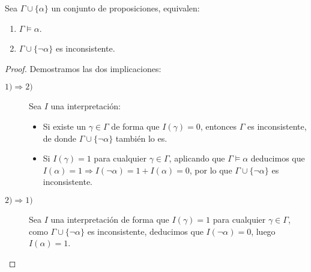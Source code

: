\begin{prop}
    Sea $\Gamma\cup\{\alpha\}$ un conjunto de proposiciones, equivalen:
    \begin{enumerate}
        \item $\Gamma\vDash \alpha$.
        \item $\Gamma\cup\{\lnot\alpha\}$ es inconsistente.
    \end{enumerate}
    \begin{proof}
        Demostramos las dos implicaciones:
        \begin{description}
            \item [$1) \Longrightarrow 2)$] Sea $I$ una interpretación:
                \begin{itemize}
                    \item Si existe un $\gamma\in \Gamma$ de forma que $I(\gamma)=0$, entonces $\Gamma$ es inconsistente, de donde $\Gamma\cup\{\lnot\alpha\}$ también lo es.
                    \item Si $I(\gamma)=1$ para cualquier $\gamma\in \Gamma$, aplicando que $\Gamma\vDash \alpha$ deducimos que\newline $I(\alpha)=1 \Longrightarrow I(\lnot\alpha) = 1 + I(\alpha) = 0$, por lo que $\Gamma\cup\{\lnot\alpha\}$ es inconsistente.
                \end{itemize}
            \item [$2) \Longrightarrow 1)$] Sea $I$ una interpretación de forma que $I(\gamma)=1$ para cualquier $\gamma\in \Gamma$, como $\Gamma\cup\{\lnot\alpha\}$ es inconsistente, deducimos que $I(\lnot\alpha) = 0$, luego $I(\alpha) = 1$.
        \end{description}
    \end{proof}
\end{prop}


